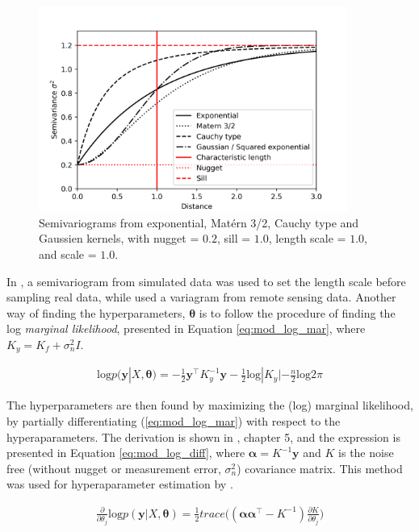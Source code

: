 \begin{figure}
    \centering
    \includegraphics[width=0.9\textwidth]{figures/kernels.png}
    \caption{Semivariograms from exponential, Matérn 3/2, Cauchy type and Gaussien kernels, with nugget = $0.2$, sill = $1.0$, length scale = $1.0$, and scale = $1.0$.}
    \label{fig:kernels}
\end{figure}

In \textcite{fossum2018information}, a semivariogram from simulated data was used to set the length scale before sampling real data, while \cite{fossum2019toward} used a variagram from remote sensing data.  Another way of finding the hyperparameters, $\mathbf{\theta}$ is to follow the procedure of finding the log \textit{marginal likelihood}, presented in Equation \eqref{eq:mod_log_mar}, where $K_y=K_f+\sigma_n^2 I$.

\begin{align}
\label{eq:mod_log_mar}
    \text{log} p(\mathbf{y}|X,\mathbf{\theta}) = -\frac{1}{2}\mathbf{y}^{\intercal}K_y^{-1}\mathbf{y} -\frac{1}{2}\text{log}|K_y|-\frac{n}{2}\text{log}2\pi
\end{align}

The hyperparameters are then found by maximizing the (log) marginal likelihood, by partially differentiating (\ref{eq:mod_log_mar}) with respect to the hyperaparameters. The derivation is shown in \textcite{rasmussen2003gaussian}, chapter 5, and the expression is presented in Equation \eqref{eq:mod_log_diff}, where $\mathbf{\alpha} = K^{-1} \mathbf{y}$ and $K$ is the noise free (without nugget or measurement error, $\sigma_n^2$) covariance matrix. This method was used for hyperaparameter estimation by \textcite{stankiewicz2021adaptive}. 

\begin{align}
    \label{eq:mod_log_diff}
    \frac{\partial}{\partial \theta_j} \text{log}p(\mathbf{y}|X,\mathbf{\theta}) = \frac{1}{2}trace\Big((\mathbf{\alpha \alpha}^{\intercal} - K^{-1})\frac{\partial K}{\partial \theta_j}\Big)
\end{align} 

